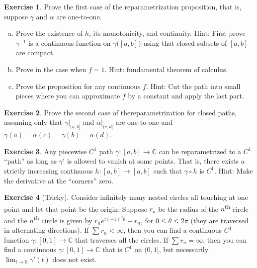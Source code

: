 \documentclass[12pt,openany]{book}
\newcommand{\C}{{\mathbb{C}}}
\theoremstyle{plain}
\theoremstyle{remark}
\theoremstyle{definition}
\newenvironment{exbox}{%
    \def\FrameCommand{\vrule width 1pt \relax\hspace{10pt}}%
    \MakeFramed{\advance\hsize-\width\FrameRestore}%
}{%
    \endMakeFramed
}
\newenvironment{exparts}{%
    \leavevmode\begin{enumerate}[a),noitemsep,topsep=0pt,parsep=0pt,partopsep=0pt]
}{%
    \end{enumerate}
}
\theoremstyle{exercise}
\newtheorem{exercise}{Exercise}[section]
\theoremstyle{example}
\begin{document}
\begin{exbox}
\begin{exercise}
Prove the first case of the reparametrization proposition, that is,
suppose $\gamma$ and $\alpha$ are one-to-one.
\begin{exparts}
\item
Prove the existence of $h$, its monotonicity, and continuity.
Hint: First prove $\gamma^{-1}$ is a continuous function on
$\gamma\bigl([a,b]\bigr)$ using that closed subsets of $[a,b]$
are compact.
\item
Prove in the case when $f=1$.
Hint: fundamental theorem of calculus.
\item
Prove the proposition for any continuous $f$.
Hint: Cut the path into small pieces where
you can approximate $f$ by a constant and apply the
last part.
\end{exparts}
\end{exercise}

\begin{exercise}
Prove the second case of thereparametrization for closed paths,
assuming only that $\gamma|_{(a,b]}$ and
$\alpha|_{(c,d]}$ are one-to-one and
$\gamma(a)=\alpha(c)=\gamma(b)=\alpha(d)$.
\end{exercise}

\begin{exercise}
Any piecewise $C^1$ path $\gamma \colon [a,b] \to \C$
can be reparametrized
to a $C^1$ ``path'' as long as $\gamma'$ is allowed to vanish at some points.
That is, there exists a strictly increasing
continuous $h \colon [a,b] \to [a,b]$ such that
$\gamma \circ h$ is $C^1$.
Hint: Make the derivative at the ``corners'' zero.
\end{exercise}

\begin{exercise}[Tricky]
Consider infinitely many nested circles all touching at one point
and let that point be the origin: Suppose $r_n$ be the radius of the
$n$\textsuperscript{th}
circle and the $n$\textsuperscript{th} circle is given by $r_n e^{i(-1)^n\theta} - r_n$, for $0 \leq
\theta \leq 2\pi$ (they are traversed in alternating directions).
If $\sum r_n < \infty$, then you can find a continuous
$C^1$ function $\gamma \colon
[0,1] \to \C$ that traverses all the circles.  If $\sum r_n = \infty$, then
you can find a continuous $\gamma \colon [0,1] \to \C$ that is $C^1$ on
$(0,1]$, but necessarily $\lim_{t \to 0} \gamma'(t)$ does not exist.
\end{exercise}
\end{exbox}
\end{document}
